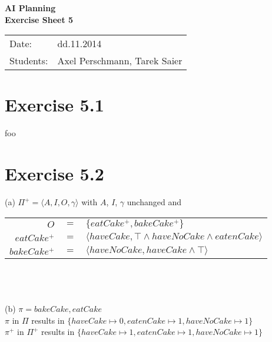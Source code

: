\documentclass[11pt,a4paper]{article}
\begin{document}
\begin{center}
\Huge{\textbf{AI Planning}}\\
\LARGE{\textbf{Exercise Sheet 5}}
\end{center}
\vspace{2cm}
\begin{tabular}{ll}
Date: & dd.11.2014\\
Students: & Axel Perschmann, Tarek Saier
\end{tabular}

\section*{Exercise 5.1}
foo

\section*{Exercise 5.2}
(a) $\Pi^+ = \langle A,I,O,\gamma \rangle$ with $A$, $I$, $\gamma$ unchanged and\\
\begin{tabular}{rcl}
$O$ & $=$ & $\{eatCake^+,bakeCake^+\}$\\
$eatCake^+$ & $=$ & $\langle haveCake, \top \land haveNoCake \land eatenCake\rangle$\\
$bakeCake^+$ & $=$ & $\langle haveNoCake, haveCake \land \top \rangle$\\
\end{tabular}\\
\\
\\
(b) $\pi = bakeCake, eatCake$\\
$\pi$ in $\Pi$ results in $\{haveCake \mapsto 0, eatenCake \mapsto 1, haveNoCake \mapsto 1\}$\\
$\pi^+$ in $\Pi^+$ results in $\{haveCake \mapsto 1, eatenCake \mapsto 1, haveNoCake \mapsto 1\}$\\
\end{document}
